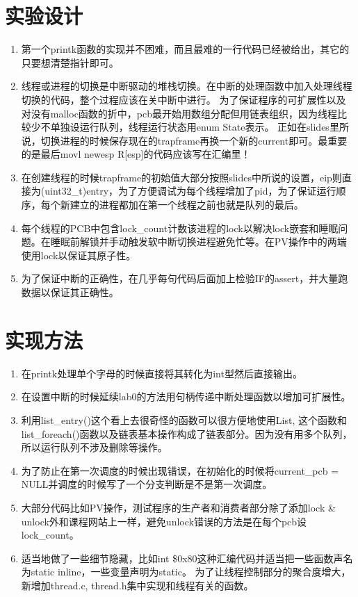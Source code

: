 \documentclass[11pt]{article}
\begin{document}
\section{实验设计}
\begin{enumerate}
  \item
    第一个printk函数的实现并不困难，而且最难的一行代码已经被给出，其它的只要想清楚指针即可。
   \item
     线程或进程的切换是中断驱动的堆栈切换。在中断的处理函数中加入处理线程切换的代码，整个过程应该在关中断中进行。
     为了保证程序的可扩展性以及对没有malloc函数的折中，pcb最开始用数组分配但用链表组织，因为线程比较少不单独设运行队列，线程运行状态用enum State表示。
     正如在slides里所说，切换进程的时候保存现在的trapframe再换一个新的current即可。最重要的是最后movl newesp R[esp]的代码应该写在汇编里！
    \item
      在创建线程的时候trapframe的初始值大部分按照slides中所说的设置，eip则直接为(uint32\_t)entry，为了方便调试为每个线程增加了pid，为了保证运行顺序，每个新建立的进程都加在第一个线程之前也就是队列的最后。
    \item
      每个线程的PCB中包含lock\_count计数该进程的lock以解决lock嵌套和睡眠问题。在睡眠前解锁并手动触发软中断切换进程避免忙等。在PV操作中的两端使用lock以保证其原子性。
    \item
      为了保证中断的正确性，在几乎每句代码后面加上检验IF的assert，并大量跑数据以保证其正确性。
\end{enumerate}

\section{实现方法}
\begin{enumerate}
   \item
      在printk处理单个字母的时候直接将其转化为int型然后直接输出。
    \item
      在设置中断的时候延续lab0的方法用句柄传递中断处理函数以增加可扩展性。
   \item
      利用list\_entry()这个看上去很奇怪的函数可以很方便地使用List, 这个函数和list\_foreach()函数以及链表基本操作构成了链表部分。因为没有用多个队列，所以运行队列不涉及删除等操作。
   \item
      为了防止在第一次调度的时候出现错误，在初始化的时候将current\_pcb = NULL并调度的时候写了一个分支判断是不是第一次调度。
    \item
      大部分代码比如PV操作，测试程序的生产者和消费者部分除了添加lock \& unlock外和课程网站上一样，避免unlock错误的方法是在每个pcb设lock\_count。
    \item
      适当地做了一些细节隐藏，比如int \$0x80这种汇编代码并适当把一些函数声名为static inline，一些变量声明为static。
      为了让线程控制部分的聚合度增大，新增加thread.c, thread.h集中实现和线程有关的函数。
\end{enumerate}
 
\end{document}
